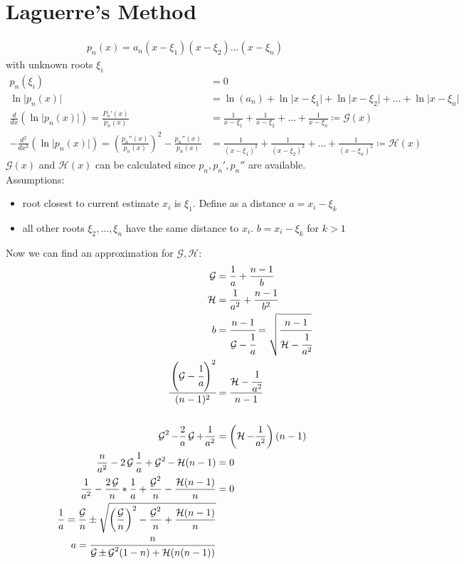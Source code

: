 \section{Laguerre's Method}\label{sec:laguerres-method}
\begin{align*}
    p_n(x) = a_n(x-\xi_1)(x-\xi_2)\ldots(x-\xi_n)
\end{align*}
with unknown roots $\xi_i$
\begin{align*}
    p_n(\xi_i) &= 0\\
    \ln \lvert p_n(x) \rvert &= \ln(a_n) + \ln \lvert x- \xi_1 \rvert + \ln \lvert x- \xi_2 \rvert
    +\ldots + \ln \lvert x- \xi_n \rvert\\
    \frac{d}{dx} \left( \ln \lvert p_n(x)\rvert \right) = \frac{P_n'(x)}{p_n(x)}
    &= \frac{1}{x-\xi_1}+\frac{1}{x-\xi_2}+ \ldots + \frac{1}{x-\xi_n} \coloneqq \mathcal{G}(x)\\
    -\frac{d^2}{dx^2}(\ln \lvert p_n(x) \rvert)= \left( \frac{p_n''(x)}{p_n(x)}\right)^2-\frac{p_n''(x)}{p_n(x)}
    &= \frac{1}{(x-\xi_1)^2}+\frac{1}{(x-\xi_2)^2}+\ldots+\frac{1}{(x-\xi_n)^2} \coloneqq \mathcal{H}(x)
\end{align*}
$\mathcal{G}(x)$ and $\mathcal{H}(x)$ can be calculated since $p_n, p_n', p_n''$ are available.
Assumptions:
\begin{itemize}
    \item root closest to current estimate $x_i$ is $\xi_1$.
    Define as a distance $a=x_i-\xi_k$
    \item all other roots $\xi_2, \ldots, \xi_n$ have the same distance to $x_i$. $b=x_i-\xi_k$ for $k>1$
\end{itemize}
Now we can find an approximation for $\mathcal{G}, \mathcal{H}$:
\begin{align*}
    \mathcal{G}&= \frac{1}{a}+ \frac{n-1}{b}\\
    \mathcal{H}&= \frac{1}{a^2}+\frac{n-1}{b^2}\\
    b &= \cfrac{n-1}{\mathcal{G}-\cfrac{1}{a}}= \sqrt{\cfrac{n-1}{\mathcal{H}-\cfrac{1}{a^2}}}\\
    \cfrac{\left(\mathcal{G}-\cfrac{1}{a} \right)^2}{(n-1)^2} &= \cfrac{\mathcal{H}- \cfrac{1}{a^2}}{n-1}\\
    \\
    \operatorname{\mathcal{G}}^2-\frac{2}{a}\operatorname{\mathcal{G}} + \frac{1}{a^2}&=\left(\operatorname{\mathcal{H}}-\frac{1}{a^2} \right)(n-1)\\
    \frac{n}{a^2}-2 \operatorname{\mathcal{G}} \frac{1}{a}+ \operatorname{\mathcal{G}}^2- \operatorname{\mathcal{H}}(n-1)&=0\\
    \frac{1}{a^2}- \frac{2 \operatorname{\mathcal{G}}}{n}*\frac{1}{a}+\frac{\operatorname{\mathcal{G}}^2}{n}-\frac{\operatorname{\mathcal{H}} (n-1)}{n} &= 0\\
    \frac{1}{a}= \frac{\operatorname{\mathcal{G}}}{n} \pm \sqrt {\left(\frac{\operatorname{\mathcal{G}}}{n} \right)^2-\frac{\operatorname{\mathcal{G}}^2}{n}+ \frac{\operatorname{\mathcal{H}} (n-1)}{n}}\\
    a=\frac{n}{\operatorname{\mathcal{G}} \pm \operatorname{\mathcal{G}}^2(1-n)+ \operatorname{\mathcal{H}} (n(n-1))}
\end{align*}
